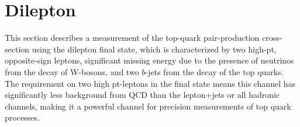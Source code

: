 
\newcommand{\dr} {\ensuremath{\Delta R({\rm lepton},{\rm jet})}}
\newcommand{\pmasym}[2]{^{+#1}_{-#2}}
\newcommand{\sigmattbar}{\ensuremath{\sigma_{\ttbar}}}
\newcommand{\sigmaz}{\ensuremath{\sigma_{\Zboson}}}
\newcommand{\lumitot}{\mbox{0.70~fb$^{-1}$}}
\newcommand{\lumitotpm}{\mbox{0.70$\pm$0.03~fb$^{-1}$}}

\newcommand{\xsectot}{171}
\newcommand{\xsecstat}{\pm 6}
\newcommand{\xsecsyst}{\pmasym{16}{14}}
\newcommand{\xseclumi}{\pm 8}

\newcommand{\xsecbtot}{177}
\newcommand{\xsecbstat}{\pm 6}
\newcommand{\xsecbsyst}{\pmasym {17}{14}}
\newcommand{\xsecblumi}{\pmasym {8}{7}}


\newcommand{\AKT}{anti-k$_{t}$}
\def\lum{{\ensuremath{\cal L}}}
\def \intlum {\int {\cal L} dt}
\def\MCatNLO{{\sc MC@NLO}}
\def\FigMerit{F_M}
\def\JetProb{{\sc JetProb}}
\def\SVZero{{\sc SV0}}
\def\Nn{N_n}  %
\def\Zg{\Zboson/\gamma^{*}}
\def\GEANT{{\sc GEANT4}}

\section{Dilepton}





This section describes a measurement of the top-quark pair-production cross-section using the
dilepton final state, which is characterized by two high-pt, opposite-sign leptons,
significant missing energy due to the presence of neutrinos from the decay of W-bosons,
and two $b$-jets from the decay of the top quarks.
The requirement on two high pt-leptons in the final state means this channel has
significantly less background from QCD than the lepton+jets or all hadronic channels,
making it a powerful channel for precision measurements of top quark processes.


